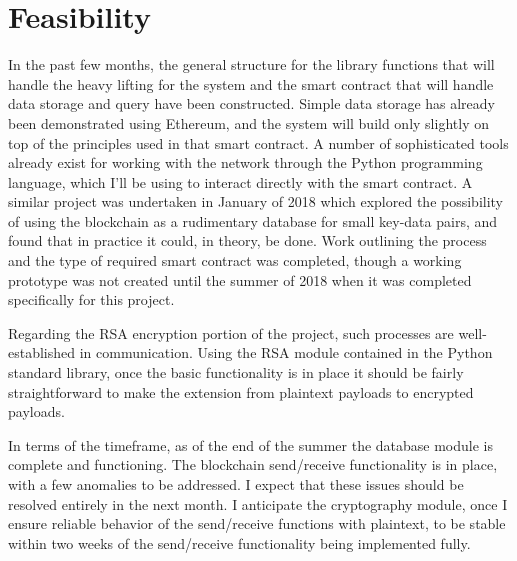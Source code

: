 \documentclass[titlepage]{report}
\begin{document}
\section{Feasibility}
In the past few months, the general structure for the library functions that will handle the heavy lifting for the system and the smart contract that will handle data storage and query have been constructed. Simple data storage has already been demonstrated using Ethereum\cite{simple-storage}, and the system will build only slightly on top of the principles used in that smart contract. A number of sophisticated tools already exist for working with the network through the Python programming language, which I'll be using to interact directly with the smart contract.\cite{web3-py} A similar project was undertaken in January of 2018 which explored the possibility of using the \gls{blockchain} as a rudimentary database for small key-data pairs, and found that in practice it could, in theory, be done. Work outlining the process and the type of required smart contract was completed, though a working prototype was not created until the summer of 2018 when it was completed specifically for this project.\cite{yadql}

Regarding the RSA encryption portion of the project, such processes are well-established in communication. Using the RSA module contained in the Python standard library, once the basic functionality is in place it should be fairly straightforward to make the extension from plaintext payloads to encrypted payloads.

In terms of the timeframe, as of the end of the summer the database module is complete and functioning. The blockchain send/receive functionality is in place, with a few anomalies to be addressed. I expect that these issues should be resolved entirely in the next month. I anticipate the cryptography module, once I ensure reliable behavior of the send/receive functions with plaintext, to be stable within two weeks of the send/receive functionality being implemented fully.

\printindex
\printglossaries{}
\printbibliography{}
\end{document}
